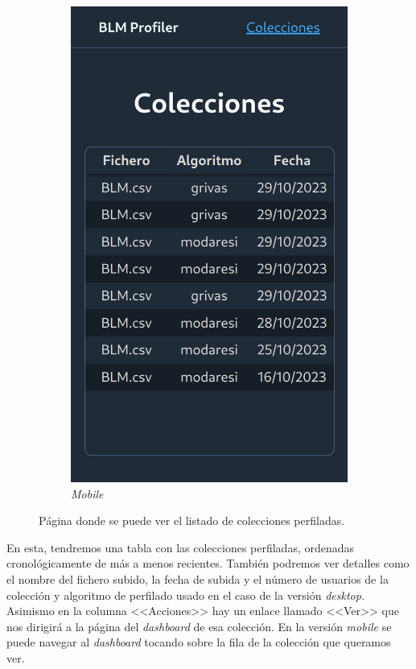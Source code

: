 \begin{figure}[H]
\begin{subfigure}{0.2115\textwidth}
   \includegraphics[width=\textwidth]{imaxes/capturas-app/mobile/colecciones.png}
  \caption{\textit{Mobile}} 
  \end{subfigure}
  \caption{Página donde se puede ver el listado de colecciones perfiladas.}
  \label{fig:app/colecciones}
\end{figure}

En esta, tendremos una tabla con las colecciones perfiladas, ordenadas cronológicamente de más a menos recientes. También podremos ver detalles como el nombre del fichero subido, la fecha de subida y el número de usuarios de la colección y algoritmo de perfilado usado en el caso de la versión \textit{desktop}. Asimismo en la columna <<Acciones>> hay un enlace llamado <<Ver>> que nos dirigirá a la página del \textit{dashboard} de esa colección. En la versión \textit{mobile} se puede navegar al \textit{dashboard} tocando sobre la fila de la colección que queramos ver.

